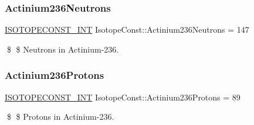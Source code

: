 \subsubsection{\texorpdfstring{Actinium236\+Neutrons}{Actinium236Neutrons}}
{\footnotesize\ttfamily \mbox{\hyperlink{group___isotope_const-_macros_ga5f18360b3e99483a35c32d789e62621c}{I\+S\+O\+T\+O\+P\+E\+C\+O\+N\+S\+T\+\_\+\+I\+NT}} Isotope\+Const\+::\+Actinium236\+Neutrons = 147}

\$ \$ Neutrons in Actinium-\/236. \mbox{\label{group___isotope_const-_actinium-_ac236_ga5854e1638fc736c8614c342316473e2f}} 
\subsubsection{\texorpdfstring{Actinium236\+Protons}{Actinium236Protons}}
{\footnotesize\ttfamily \mbox{\hyperlink{group___isotope_const-_macros_ga5f18360b3e99483a35c32d789e62621c}{I\+S\+O\+T\+O\+P\+E\+C\+O\+N\+S\+T\+\_\+\+I\+NT}} Isotope\+Const\+::\+Actinium236\+Protons = 89}

\$ \$ Protons in Actinium-\/236. 